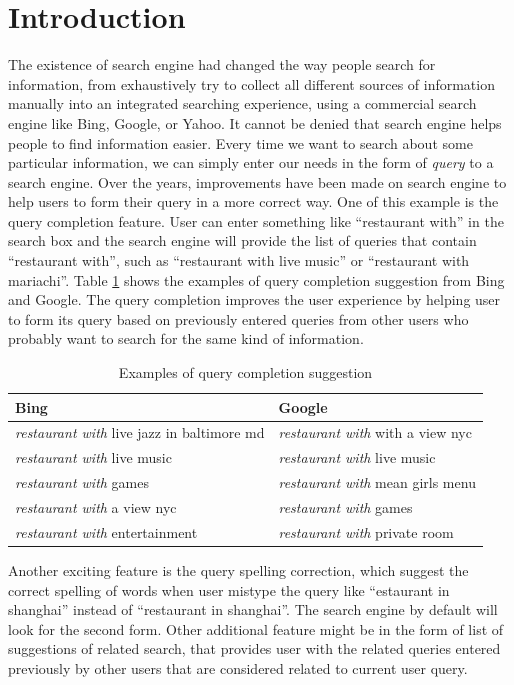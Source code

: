 \section{Introduction}
The existence of search engine had changed the way people search 
for information, from exhaustively try to collect all different 
sources of information manually into an integrated searching experience, 
using a commercial search engine like Bing, Google, or Yahoo. 
It cannot be denied that search engine helps people to find information
easier. Every time we want to search about some particular information, 
we can simply enter our needs in the form of \textit{query} to a search 
engine. Over the years, improvements have been made on search engine to 
help users to form their query in a more correct way. One of this example 
is the query completion feature. User can enter something like 
``restaurant with'' in the search box and the search engine will provide 
the list of queries that contain ``restaurant with'', such as 
``restaurant with live music'' or ``restaurant with mariachi''. 
Table \ref{tab:querycompletion} shows the examples of query completion 
suggestion from Bing and Google. The query completion improves the user 
experience by helping user to form its query based on previously entered 
queries from other users who probably want to search for the same kind of 
information. 

\begin{table}[h]
\centering
\caption{Examples of query completion suggestion}
\begin{tabular}{ | p{3 cm} | p{3 cm} | }
\hline
\textbf{Bing} & \textbf{Google}\\ \hline
\textit{restaurant with} live jazz in baltimore md & \textit{restaurant with} with a view nyc \\ \hline 
\textit{restaurant with} live music & \textit{restaurant with} live music \\ \hline
\textit{restaurant with} games & \textit{restaurant with} mean girls menu \\ \hline
\textit{restaurant with} a view nyc & \textit{restaurant with} games \\ \hline
\textit{restaurant with} entertainment & \textit{restaurant with} private room \\ \hline
\end{tabular}
\centering
\label{tab:querycompletion}
\end{table}

Another exciting feature is the query spelling correction, which 
suggest the correct spelling of words when user mistype the query 
like ``estaurant in shanghai'' instead of ``restaurant in shanghai''. 
The search engine by default will look for the second form. Other 
additional feature might be in the form of list of suggestions of 
related search, that provides user with the related queries entered 
previously by other users that are considered related to current 
user query.

